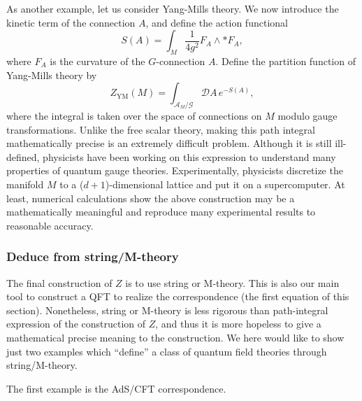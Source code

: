 As another example, let us consider Yang-Mills theory. We now introduce
the kinetic term of the connection $A$, and define the action functional
\begin{equation}
  S\left(A\right)  =  \int_{M}\frac{1}{4g^{2}}F_{A}\wedge*F_{A},
\end{equation}
where $F_{A}$ is the curvature of the $G$-connection $A$. Define
the partition function of Yang-Mills theory by
\begin{equation}
  Z_{\mathrm{YM}}\left(M\right)  =  \int_{\mathcal{A}_{M}/\mathcal{G}}\mathcal{D}A\,e^{-S\left(A\right)},
\end{equation}
where the integral is taken over the space of connections on $M$
modulo gauge transformations. Unlike the free scalar theory, making
this path integral mathematically precise is an extremely difficult
problem. Although it is still ill-defined, physicists have been working
on this expression to understand many properties of quantum gauge
theories. Experimentally, physicists discretize the manifold $M$
to a ($d+1$)-dimensional lattice and put it on a supercomputer. At
least, numerical calculations show the above construction may be a
mathematically meaningful and reproduce many experimental results
to reasonable accuracy.

\subsubsection*{Deduce from string/M-theory}

The final construction of $Z$ is to use string or M-theory. This
is also our main tool to construct a QFT to realize the correspondence
(the first equation of this section). Nonetheless, string or M-theory
is less rigorous than path-integral expression of the construction
of $Z$, and thus it is more hopeless to give a mathematical precise
meaning to the construction. We here would like to show just two examples
which ``define'' a class of quantum field theories through string/M-theory.

The first example is the AdS/CFT correspondence.

